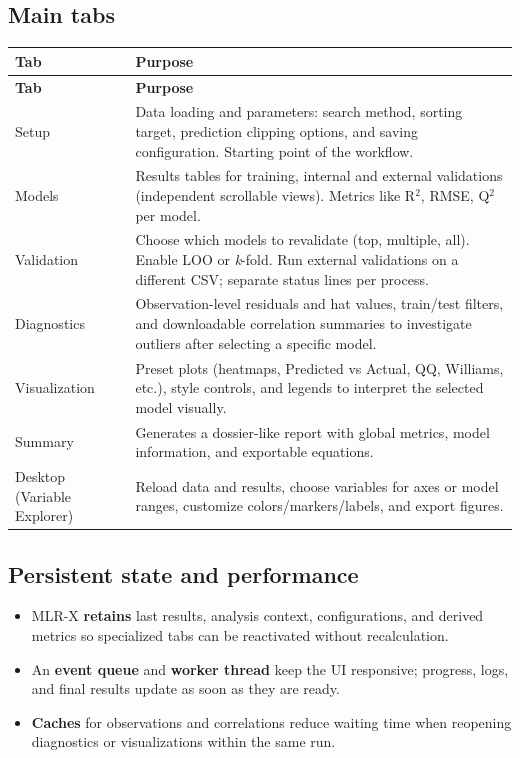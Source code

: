 \documentclass[12pt,a4paper]{article}
\begin{document}
\subsection{Main tabs}
\begin{longtable}{@{}p{3cm}p{11.2cm}@{}}
\toprule
\textbf{Tab} & \textbf{Purpose} \\
\midrule
\endfirsthead
\toprule
\textbf{Tab} & \textbf{Purpose} \\
\midrule
\endhead
Setup &
Data loading and parameters: search method, sorting target, prediction clipping options, and saving configuration. Starting point of the workflow.\\
Models &
Results tables for training, internal and external validations (independent scrollable views). Metrics like R$^2$, RMSE, Q$^2$ per model.\\
Validation &
Choose which models to revalidate (top, multiple, all). Enable LOO or \emph{k}-fold. Run external validations on a different CSV; separate status lines per process.\\
Diagnostics &
Observation-level residuals and hat values, train/test filters, and downloadable correlation summaries to investigate outliers after selecting a specific model.\\
Visualization &
Preset plots (heatmaps, Predicted vs Actual, QQ, Williams, etc.), style controls, and legends to interpret the selected model visually.\\
Summary &
Generates a dossier-like report with global metrics, model information, and exportable equations.\\
Desktop (Variable Explorer) &
Reload data and results, choose variables for axes or model ranges, customize colors/markers/labels, and export figures.\\
\bottomrule
\end{longtable}

\subsection{Persistent state and performance}
\begin{itemize}
  \item MLR-X \textbf{retains} last results, analysis context, configurations, and derived metrics so specialized tabs can be reactivated without recalculation.
  \item An \textbf{event queue} and \textbf{worker thread} keep the UI responsive; progress, logs, and final results update as soon as they are ready.
  \item \textbf{Caches} for observations and correlations reduce waiting time when reopening diagnostics or visualizations within the same run.
\end{itemize}
\end{document}
